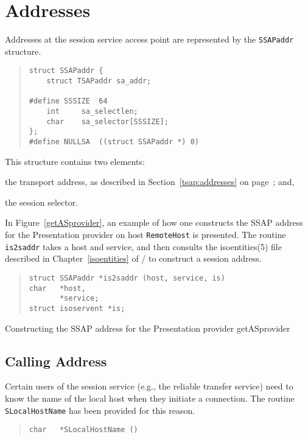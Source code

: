 \section	{Addresses}\label{ssap:addresses}
Addresses at the session service access point are represented by the
\verb"SSAPaddr" structure.
\begin{quote}\small\begin{verbatim}
struct SSAPaddr {
    struct TSAPaddr sa_addr;

#define SSSIZE  64
    int     sa_selectlen;
    char    sa_selector[SSSIZE];
};
#define NULLSA  ((struct SSAPaddr *) 0)
\end{verbatim}\end{quote}
This structure contains two elements:
\begin{describe}
\item[\verb"sa\_addr":]	the transport address,
as described in Section~\ref{tsap:addresses} on page~\pageref{tsap:addresses};
and,

\item[\verb"sa\_selector"/\verb"sa\_selectlen":] the session selector.
\end{describe}

In Figure~\ref{getASprovider},
an example of how one constructs the SSAP address for the Presentation provider
on host \verb"RemoteHost" is presented.
The routine \verb"is2saddr" takes a host and service,
and then consults the \man isoentities(5) file described in
Chapter~\ref{isoentities} of \volone/ to construct a session
address.
\begin{quote}\small\begin{verbatim}
struct SSAPaddr *is2saddr (host, service, is)
char   *host,
       *service;
struct isoservent *is;
\end{verbatim}\end{quote}
%
	{Constructing the SSAP address for the Presentation provider}%
	{getASprovider}

\subsection	{Calling Address}
Certain users of the session service
(e.g., the reliable transfer service)
need to know the name of the local host when they initiate a connection.
The routine \verb"SLocalHostName" has been provided for this reason.
\begin{quote}\small\begin{verbatim}
char   *SLocalHostName ()
\end{verbatim}\end{quote}

